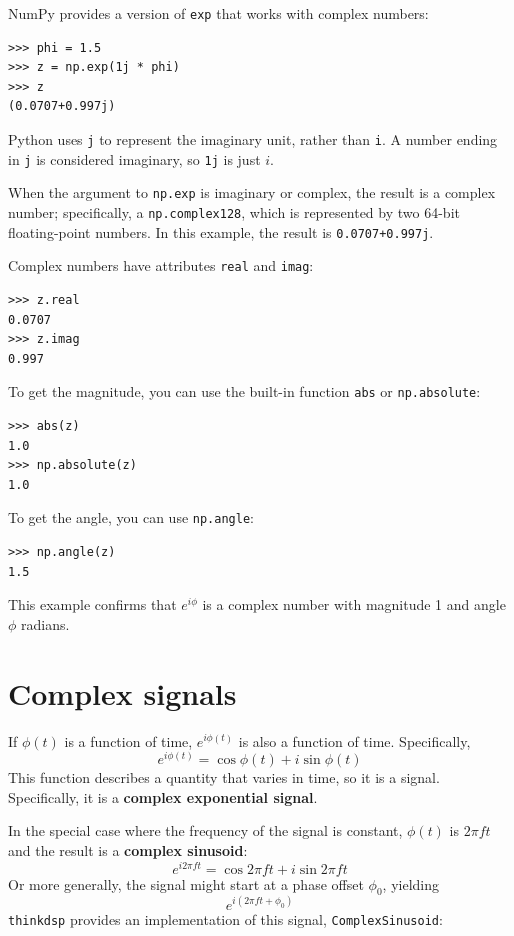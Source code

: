 \documentclass[12pt]{book}
\begin{document}
NumPy provides a version of {\tt exp} that works with complex numbers:

\begin{verbatim}
>>> phi = 1.5
>>> z = np.exp(1j * phi)
>>> z
(0.0707+0.997j)
\end{verbatim}

Python uses {\tt j} to represent the imaginary unit, rather
than {\tt i}.  A number ending in {\tt j} is considered imaginary,
so {\tt 1j} is just $i$.

When the argument to {\tt np.exp} is imaginary or complex, the
result is a complex number; specifically, a {\tt np.complex128},
which is represented by two 64-bit floating-point numbers.
In this example, the result is {\tt 0.0707+0.997j}.

Complex numbers have attributes {\tt real} and {\tt imag}:

\begin{verbatim}
>>> z.real
0.0707
>>> z.imag
0.997
\end{verbatim}

To get the magnitude, you can use the built-in function {\tt abs}
or {\tt np.absolute}:

\begin{verbatim}
>>> abs(z)
1.0
>>> np.absolute(z)
1.0
\end{verbatim}

To get the angle, you can use {\tt np.angle}:

\begin{verbatim}
>>> np.angle(z)
1.5
\end{verbatim}

This example confirms that $e^{i \phi}$ is a complex number with
magnitude 1 and angle $\phi$ radians.


\section{Complex signals}

If $\phi(t)$ is a function of time, $e^{i \phi(t)}$ is also a function
of time.  Specifically,
%
\[ e^{i \phi(t)} = \cos \phi(t) + i \sin \phi(t) \]
%
This function describes a quantity that varies in time, so it is
a signal.  Specifically, it is a {\bf complex exponential signal}.

In the special case where the frequency of the signal is constant,
$\phi(t)$ is $2 \pi f t$ and the result is a {\bf complex sinusoid}:
%
\[ e^{i 2 \pi f t} = \cos 2 \pi f t + i \sin 2 \pi f t \]
%
Or more generally, the signal might start at a phase offset
$\phi_0$, yielding
%
\[ e^{i (2 \pi f t + \phi_0)} \]
%
{\tt thinkdsp} provides an implementation of this signal,
{\tt ComplexSinusoid}:
\end{document}

